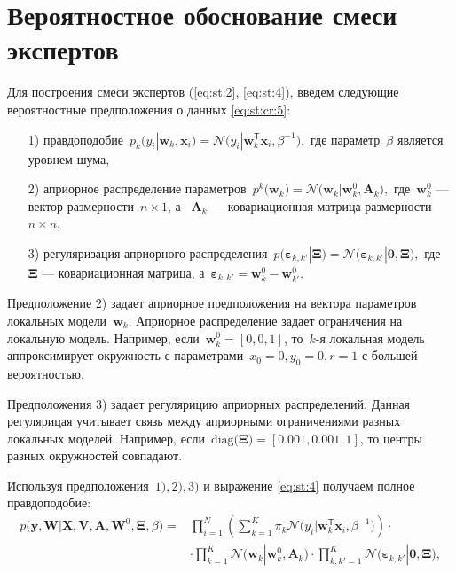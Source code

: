 \section{Вероятностное обоснование смеси экспертов}
Для построения смеси экспертов (\ref{eq:st:2},  \ref{eq:st:4}), введем следующие вероятностные предположения о данных \eqref{eq:st:cr:5}:

\begin{enumerate}
	\item[1)] правдоподобие~$p_{k}\bigr(y_{i}|\mathbf{w}_{k}, \mathbf{x}_{i}\bigr) = \mathcal{N}\bigr(y_{i}|\mathbf{w}_{k}^{\mathsf{T}}\mathbf{x}_{i}, \beta^{-1}\bigr),$ где параметр~$\beta$ является уровнем шума,
	\item[2)] априорное распределение параметров~$p^{k}\bigr(\mathbf{w}_{k}\bigr) = \mathcal{N}\bigr(\mathbf{w}_{k}|\mathbf{w}^{0}_{k}, \mathbf{A}_{k}\bigr),$ где~$\mathbf{w}^{0}_{k}$ --- вектор размерности~$n\times1$, а ~$\mathbf{A}_{k}$ --- ковариационная матрица размерности~$n\times n$,
	\item[3)] регуляризация априорного распределения~$p\bigr(\bm{\varepsilon}_{k,k'}|\bm{\Xi}\bigr) = \mathcal{N}\bigr(\bm{\varepsilon}_{k,k'}|\mathbf{0},  \bm{\Xi}\bigr),$ где~$\bm{\Xi}$ --- ковариационная матрица, а~$\bm{\varepsilon}_{k,k'} = \mathbf{w}_{k}^{0}-\mathbf{w}_{k'}^{0}.$
\end{enumerate}
Предположение 2) задает априорное предположения на вектора параметров локальных модели~$\textbf{w}_k$. Априорное распределение  задает ограничения на локальную модель. Например, если~$\textbf{w}_k^{0} = [0,0,1]$, то~$k$-я локальная модель аппроксимирует окружность с параметрами~$x_0=0, y_0=0, r=1$ с большей вероятностью.

Предположения 3) задает регулярицию априорных распределений. Данная регулярицая учитывает связь между априорными ограничениями разных локальных моделей. Например, если~$\text{diag}\bigr(\bm{\Xi}\bigr)=[0.001, 0.001, 1]$, то  центры разных окружностей совпадают.

Используя предположения~$1), 2), 3)$ и выражение \eqref{eq:st:4} получаем полное правдоподобие:
\[
\label{eq:em:1}
\begin{aligned}
p\bigr(\mathbf{y}, \mathbf{W}|\mathbf{X}, \mathbf{V}, \textbf{A}, \textbf{W}^{0}, \bm{\Xi}, \beta\bigr) = &\prod_{i=1}^{N}\left(\sum_{k=1}^{K}\pi_{k}\mathcal{N}\bigr(y_{i}|\mathbf{w}_{k}^{\mathsf{T}}\mathbf{x}_{i}, \beta^{-1}\bigr)\right)\cdot\\
&\cdot\prod_{k=1}^{K}\mathcal{N}\bigr(\mathbf{w}_{k}|\mathbf{w}^{0}_{k}, \mathbf{A}_{k}\bigr)\cdot\prod_{k,k'=1}^{K}\mathcal{N}\bigr(\bm{\varepsilon}_{k,k'}|\mathbf{0},  \bm{\Xi}\bigr),
\end{aligned}
\]


